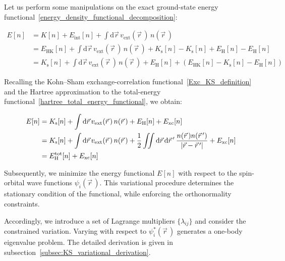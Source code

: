 Let us perform some manipulations on the exact ground-state energy functional~\eqref{energy_density_functional_decomposition}:

\begin{equation}
\begin{aligned}
    E[n] &= K[n]+E_\mathrm{int}[n]
    +\int\mathrm{d}\vec{r}\,v_\mathrm{ext}(\vec{r}\,)\,n(\vec{r}\,) \\
    &= E_\mathrm{HK}[n]
    + \int\mathrm{d}\vec{r}\,v_\mathrm{ext}(\vec{r}\,)\,n(\vec{r}\,)
    + K_\mathrm{s}[n] - K_\mathrm{s}[n] + E_\mathrm{H}[n] - E_\mathrm{H}[n] \\
    &= K_\mathrm{s}[n] +
    \int\mathrm{d}\vec{r}\,v_\mathrm{ext}(\vec{r}\,)\,n(\vec{r}\,)
    + E_\mathrm{H}[n] + (E_\mathrm{HK}[n]-K_\mathrm{s}[n]-E_\mathrm{H}[n])
\end{aligned}
\label{energy_density_functional_manipulations}
\end{equation}

Recalling the Kohn--Sham exchange-correlation functional~\eqref{Exc_KS_definition}
and the Hartree approximation to the total-energy functional~\eqref{hartree_total_energy_functional},
we obtain:

\begin{equation}
\begin{aligned}
    E[n] &= K_\mathrm{s}[n]
    + \int\mathrm{d}\vec{r}\,v_\mathrm{ext}(\vec{r}\,)\,n(\vec{r}\,)
    + E_\mathrm{H}[n] + E_\mathrm{xc}[n] \\
    &= K_\mathrm{s}[n]
    + \int\mathrm{d}\vec{r}\,v_\mathrm{ext}(\vec{r}\,)\,n(\vec{r}\,)
    + \frac{1}{2}\iint\mathrm{d}{\vec{r}}\,\mathrm{d}{\vec{r}\,'}\,\frac{n(\vec{r}\,)n(\vec{r}\,')}{|\vec{r}-\vec{r}\,'|}
    + E_\mathrm{xc}[n] \\
    &= E_\mathrm{H}^\mathrm{tot}[n] + E_\mathrm{xc}[n]
\end{aligned}
\end{equation}

Subsequently, we minimize the energy functional $E[n]$ with respect to the spin-orbital wave functions $\psi_i(\vec{r}\,)$.
This variational procedure determines the stationary condition of the functional, while enforcing the orthonormality constraints.

Accordingly, we introduce a set of Lagrange multipliers $\{\lambda_{ij}\}$ and consider the constrained variation.
Varying with respect to $\psi_i^\ast(\vec{r}\,)$ generates a one-body eigenvalue problem.
The detailed derivation is given in subsection~\ref{subsec:KS_variational_derivation}.

